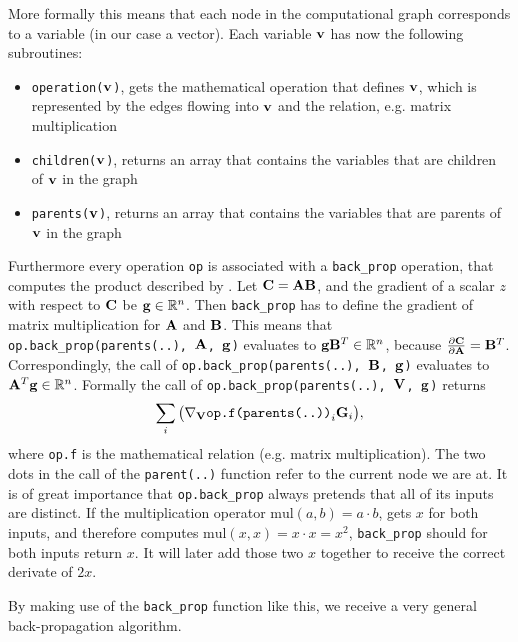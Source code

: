 More formally this means that each node in the computational graph corresponds to a variable (in our case a vector).
Each variable \(\mathbf{v}\) has now the following subroutines:
\begin{itemize}
    \item \texttt{operation(\(\mathbf{v}\))}, gets the mathematical operation that defines \(\mathbf{v}\),
    which is represented by the edges flowing into \(\mathbf{v}\) and the relation, e.g. matrix multiplication
    \item \texttt{children(\(\mathbf{v}\))}, returns an array that contains the variables that are children of \(\mathbf{v}\) in the graph
    \item \texttt{parents(\(\mathbf{v}\))}, returns an array that contains the variables that are parents of \(\mathbf{v}\) in the graph 
\end{itemize}
Furthermore every operation \texttt{op} is associated with a \texttt{back\_prop} operation, that computes the product described by .
Let \(\mathbf{C} = \mathbf{AB}\), and the gradient of a scalar \(z\) with respect to \(\mathbf{C}\) be \(\mathbf{g} \in \mathbb{R}^n\).
Then \texttt{back\_prop} has to define the gradient of matrix multiplication for \(\mathbf{A}\) and \(\mathbf{B}\).
This means that \texttt{op.back\_prop(parents(..), \(\mathbf{A}\), \(\mathbf{g}\))} evaluates to \(\mathbf{g}\mathbf{B}^T \in \mathbb{R}^n\), because \(\frac{\partial \mathbf{C}}{\partial \mathbf{A}} = \mathbf{B}^T\).
Correspondingly, the call of \texttt{op.back\_prop(parents(..), \(\mathbf{B}\), \(\mathbf{g}\))} evaluates to \(\mathbf{A}^T\mathbf{g} \in \mathbb{R}^n\).
Formally the call of \texttt{op.back\_prop(parents(..), \(\mathbf{V}\), \(\mathbf{g}\))} returns
\begin{equation}
    \sum_{i} \big( \nabla_{\mathbf{V}} \texttt{op.f(parents(..))}_{i} \mathbf{G}_{i} \big),
\end{equation}
where \texttt{op.f} is the mathematical relation (e.g. matrix multiplication).
The two dots in the call of the \texttt{parent(..)} function refer to the current node we are at.
It is of great importance that \texttt{op.back\_prop} always pretends that all of its inputs are distinct.
If the multiplication operator \(\text{mul}(a,b) = a \cdot b\), gets \(x\) for both inputs, and therefore computes \(\text{mul}(x,x)= x \cdot x = x^2\), 
\texttt{back\_prop} should for both inputs return \(x\).
It will later add those two \(x\) together to receive the correct derivate of \(2x\).

By making use of the \texttt{back\_prop} function like this, we receive a very general back-propagation algorithm. \\

